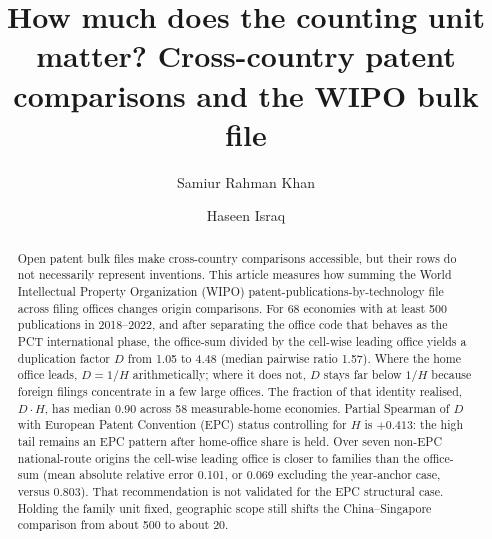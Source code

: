 \documentclass[a4paper,fleqn]{cas-dc}
\begin{document}
\let\WriteBookmarks\relax
\def\floatpagepagefraction{1}
\def\textpagefraction{.001}


\title[mode=title]{How much does the counting unit matter? Cross-country patent
comparisons and the {WIPO} bulk file}

\author[1]{Samiur Rahman Khan}
\cormark[1]

\author[2]{Haseen Israq}


\begin{abstract}
Open patent bulk files make cross-country comparisons accessible, but their
rows do not necessarily represent inventions. This article measures how
summing the World Intellectual Property Organization (WIPO)
patent-publications-by-technology file across filing offices changes origin
comparisons. For 68 economies with at least 500 publications in 2018--2022,
and after separating the office code that behaves as the PCT international
phase, the office-sum divided by the cell-wise leading office yields a
duplication factor $D$ from 1.05 to 4.48 (median pairwise ratio 1.57). Where
the home office leads, $D=1/H$ arithmetically; where it does not, $D$ stays
far below $1/H$ because foreign filings concentrate in a few large offices.
The fraction of that identity realised, $D\cdot H$, has median 0.90 across
58 measurable-home economies. Partial Spearman of $D$ with European Patent
Convention (EPC) status controlling for $H$ is $+0.413$: the high tail
remains an EPC pattern after home-office share is held. Over seven non-EPC
national-route origins the cell-wise leading office is closer to families
than the office-sum (mean absolute relative error 0.101, or 0.069 excluding
the year-anchor case, versus 0.803). That recommendation is not validated
for the EPC structural case. Holding the family unit fixed, geographic scope
still shifts the China--Singapore comparison from about 500 to about 20.
\end{abstract}
\end{document}
